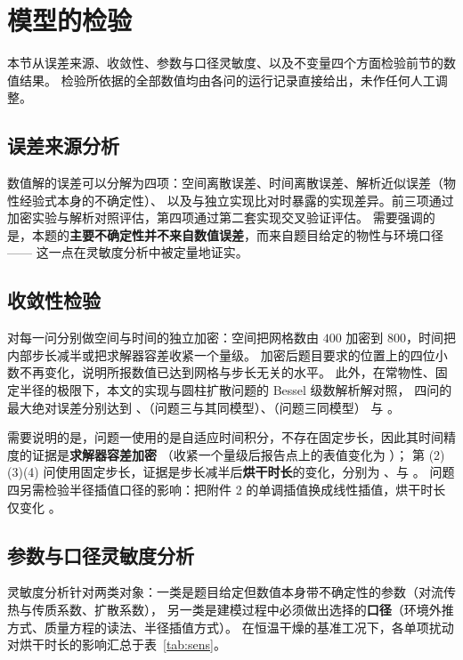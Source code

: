 \section{模型的检验}

本节从误差来源、收敛性、参数与口径灵敏度、以及不变量四个方面检验前节的数值结果。
检验所依据的全部数值均由各问的运行记录直接给出，未作任何人工调整。

\subsection{误差来源分析}

数值解的误差可以分解为四项：空间离散误差、时间离散误差、解析近似误差（物性经验式本身的不确定性）、
以及与独立实现比对时暴露的实现差异。前三项通过加密实验与解析对照评估，第四项通过第二套实现交叉验证评估。
需要强调的是，本题的\textbf{主要不确定性并不来自数值误差}，而来自题目给定的物性与环境口径——
这一点在灵敏度分析中被定量地证实。

\subsection{收敛性检验}

对每一问分别做空间与时间的独立加密：空间把网格数由 $400$ 加密到 $800$，时间把内部步长减半或把求解器容差收紧一个量级。
加密后题目要求的位置上的四位小数不再变化，说明所报数值已达到网格与步长无关的水平。
此外，在常物性、固定半径的极限下，本文的实现与圆柱扩散问题的 Bessel 级数解析解对照，
四问的最大绝对误差分别达到 
\qoneanalyticalmaxabserr、\qtwoanalyticalmaxabserr（问题三与其同模型）、\qtwoanalyticalmaxabserr（问题三同模型） 与 \qfourreferencemaxabserr。

需要说明的是，问题一使用的是自适应时间积分，不存在固定步长，因此其时间精度的证据是\textbf{求解器容差加密}
（收紧一个量级后报告点上的表值变化为 \qonetimeaccuracytolerancediff）；
第 (2)(3)(4) 问使用固定步长，证据是步长减半后\textbf{烘干时长}的变化，分别为 
\qtwotimerefinementdiff、\qthreetimerefinementdiff 与 \qfourtimerefinementhours。
问题四另需检验半径插值口径的影响：把附件 2 的单调插值换成线性插值，烘干时长仅变化 \qfourradiusinterphours。

\subsection{参数与口径灵敏度分析}

灵敏度分析针对两类对象：一类是题目给定但数值本身带不确定性的参数（对流传热与传质系数、扩散系数），
另一类是建模过程中必须做出选择的\textbf{口径}（环境外推方式、质量方程的读法、半径插值方式）。
在恒温干燥的基准工况下，各单项扰动对烘干时长的影响汇总于表~\ref{tab:sens}。

